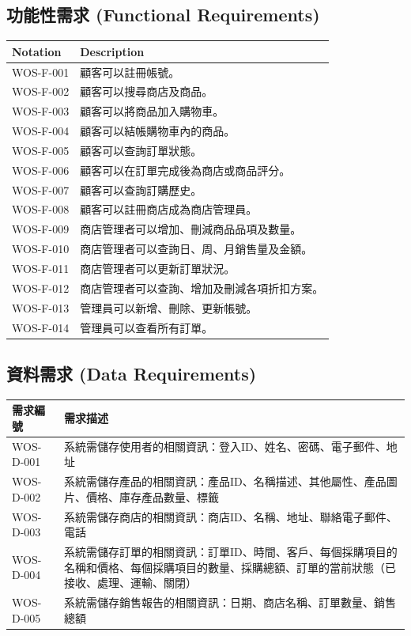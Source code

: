 \documentclass[a4paper, 12pt]{article}
\begin{document}
\subsection{功能性需求 (Functional Requirements)}

\noindent \begin{tabular}{ | p{6.5em} | p{32em} |}
  \hline
  Notation & Description \\
  \hline
  WOS-F-001 & 顧客可以註冊帳號。 \\
  \hline
  WOS-F-002 & 顧客可以搜尋商店及商品。 \\
  \hline
  WOS-F-003 & 顧客可以將商品加入購物車。 \\
  \hline
  WOS-F-004 & 顧客可以結帳購物車內的商品。 \\
  \hline
  WOS-F-005 & 顧客可以查詢訂單狀態。 \\
  \hline
  WOS-F-006 & 顧客可以在訂單完成後為商店或商品評分。 \\
  \hline
  WOS-F-007 & 顧客可以查詢訂購歷史。 \\
  \hline
  WOS-F-008 & 顧客可以註冊商店成為商店管理員。 \\
  \hline
  WOS-F-009 & 商店管理者可以增加、刪減商品品項及數量。 \\
  \hline
  WOS-F-010 & 商店管理者可以查詢日、周、月銷售量及金額。 \\
  \hline
  WOS-F-011 & 商店管理者可以更新訂單狀況。 \\
  \hline
  WOS-F-012 & 商店管理者可以查詢、增加及刪減各項折扣方案。 \\
  \hline
  WOS-F-013 & 管理員可以新增、刪除、更新帳號。 \\
  \hline
  WOS-F-014 & 管理員可以查看所有訂單。 \\
  \hline
\end{tabular} \par

\subsection{資料需求 (Data Requirements)}
\noindent\begin{tabular}{|l| p{32em}|}
    \hline
    需求編號 & 需求描述 \\
    \hline
    WOS-D-001 & 系統需儲存使用者的相關資訊：登入ID、姓名、密碼、電子郵件、地址 \\
    \hline
    WOS-D-002 & 系統需儲存產品的相關資訊：產品ID、名稱描述、其他屬性、產品圖片、價格、庫存產品數量、標籤 \\
    \hline
    WOS-D-003 & 系統需儲存商店的相關資訊：商店ID、名稱、地址、聯絡電子郵件、電話 \\
    \hline
    WOS-D-004 & 系統需儲存訂單的相關資訊：訂單ID、時間、客戶、每個採購項目的名稱和價格、每個採購項目的數量、採購總額、訂單的當前狀態（已接收、處理、運輸、關閉） \\
    \hline
    WOS-D-005 & 系統需儲存銷售報告的相關資訊：日期、商店名稱、訂單數量、銷售總額 \\
    \hline
\end{tabular}
\end{document}
